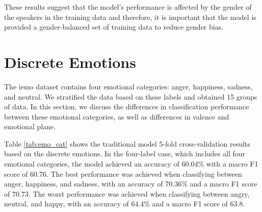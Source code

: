 These results suggest that the model's performance is affected by the gender of the speakers in the training data and therefore, it is important that the model is provided a gender-balanced set of training data to reduce gender bias.

\section{Discrete Emotions}

The \ac{iemo} dataset contains four emotional categories: anger, happiness, sadness, and neutral. We stratified the data based on these labels and obtained 15 groups of data. In this section, we discuss the differences in classification performance between these emotional categories, as well as differences in valence and emotional plane.


Table \ref{tab:emo_cat} shows the traditional model 5-fold cross-validation results based on the discrete emotions. In the four-label case, which includes all four emotional categories, the model achieved an accuracy of 60.04\% with a macro F1 score of 60.76. The best performance was achieved when classifying between anger, happiness, and sadness, with an accuracy of 70.36\% and a macro F1 score of 70.73. The worst performance was achieved when classifying between angry, neutral, and happy, with an accuracy of 64.4\% and a macro F1 score of 63.8.


